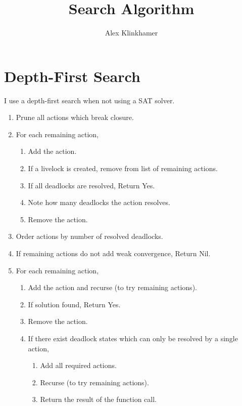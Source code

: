 



\title{Search Algorithm}
\author{Alex Klinkhamer}
\maketitle

\section{Depth-First Search}
I use a depth-first search when not using a SAT solver.

\begin{enumerate}
 \item Prune all actions which break closure.
 \item For each remaining action,
  \begin{enumerate}
   \item Add the action.
   \item If a livelock is created, remove from list of remaining actions.
   \item If all deadlocks are resolved, Return Yes.
   \item Note how many deadlocks the action resolves.
   \item Remove the action.
  \end{enumerate}
 \item Order actions by number of resolved deadlocks.
 \item If remaining actions do not add weak convergence, Return Nil.
 \item For each remaining action,
  \begin{enumerate}
   \item Add the action and recurse (to try remaining actions).
   \item If solution found, Return Yes.
   \item Remove the action.
   \item If there exist deadlock states which can only be resolved by a single action,
    \begin{enumerate}
     \item Add all required actions.
     \item Recurse (to try remaining actions).
     \item Return the result of the function call.
    \end{enumerate}
  \end{enumerate}
\end{enumerate}

